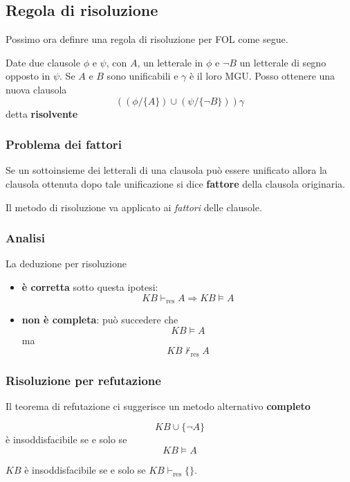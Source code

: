 \subsection{Regola di risoluzione}
Possimo ora definre una regola di risoluzione per FOL come segue.

Date due clausole $\phi$ e $\psi$, con $A$, un letterale in $\phi$ e $\lnot B$ un letterale di segno opposto in
$\psi$. Se $A$ e $B$ sono unificabili e $\gamma$ \`e il loro MGU. Posso ottenere una nuova clausola
\[ ((\phi / \{ A \}) \cup (\psi / \{ \lnot B \})) \gamma \]
detta \textbf{risolvente}

\subsubsection{Problema dei fattori}
Se un sottoinsieme dei letterali di una clausola pu\`o essere unificato allora la clausola ottenuta dopo tale
unificazione si dice \textbf{fattore} della clausola originaria.

Il metodo di risoluzione va applicato ai \emph{fattori} delle clausole.

\subsubsection{Analisi}
La deduzione per risoluzione
\begin{itemize}
	\item \textbf{\`e corretta} sotto questa ipotesi:
	      \[ KB \vdash_{\text{res}} A \Rightarrow KB \models A \]
	\item \textbf{non \`e completa}: pu\`o succedere che
	      \[ KB \models A \]
	      ma
	      \[ KB \not\vdash_{\text{res}} A \]
\end{itemize}

\subsubsection{Risoluzione per refutazione}
Il teorema di refutazione ci suggerisce un metodo alternativo \textbf{completo}

\begin{theorem}
	\[ KB \cup \{ \lnot A \} \]
	\`e insoddisfacibile se e solo se
	\[ KB \models A \]
\end{theorem}

\begin{theorem}
	$KB$ \`e insoddisfacibile se e solo se $KB \vdash_{\text{res}} \{ \}$.
\end{theorem}

